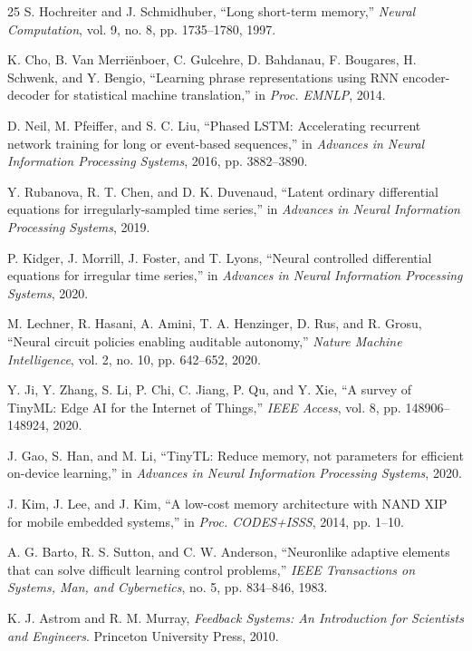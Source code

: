 \documentclass[conference]{IEEEtran}
\begin{document}
\begin{thebibliography}{25}
 S. Hochreiter and J. Schmidhuber, ``Long short-term memory,'' \textit{Neural Computation}, vol. 9, no. 8, pp. 1735--1780, 1997.

 K. Cho, B. Van Merri\"enboer, C. Gulcehre, D. Bahdanau, F. Bougares, H. Schwenk, and Y. Bengio, ``Learning phrase representations using RNN encoder-decoder for statistical machine translation,'' in \textit{Proc. EMNLP}, 2014.

 D. Neil, M. Pfeiffer, and S. C. Liu, ``Phased LSTM: Accelerating recurrent network training for long or event-based sequences,'' in \textit{Advances in Neural Information Processing Systems}, 2016, pp. 3882--3890.

 Y. Rubanova, R. T. Chen, and D. K. Duvenaud, ``Latent ordinary differential equations for irregularly-sampled time series,'' in \textit{Advances in Neural Information Processing Systems}, 2019.

 P. Kidger, J. Morrill, J. Foster, and T. Lyons, ``Neural controlled differential equations for irregular time series,'' in \textit{Advances in Neural Information Processing Systems}, 2020.

 M. Lechner, R. Hasani, A. Amini, T. A. Henzinger, D. Rus, and R. Grosu, ``Neural circuit policies enabling auditable autonomy,'' \textit{Nature Machine Intelligence}, vol. 2, no. 10, pp. 642--652, 2020.

 Y. Ji, Y. Zhang, S. Li, P. Chi, C. Jiang, P. Qu, and Y. Xie, ``A survey of TinyML: Edge AI for the Internet of Things,'' \textit{IEEE Access}, vol. 8, pp. 148906--148924, 2020.

 J. Gao, S. Han, and M. Li, ``TinyTL: Reduce memory, not parameters for efficient on-device learning,'' in \textit{Advances in Neural Information Processing Systems}, 2020.

 J. Kim, J. Lee, and J. Kim, ``A low-cost memory architecture with NAND XIP for mobile embedded systems,'' in \textit{Proc. CODES+ISSS}, 2014, pp. 1--10.

 A. G. Barto, R. S. Sutton, and C. W. Anderson, ``Neuronlike adaptive elements that can solve difficult learning control problems,'' \textit{IEEE Transactions on Systems, Man, and Cybernetics}, no. 5, pp. 834--846, 1983.

 K. J. Astrom and R. M. Murray, \textit{Feedback Systems: An Introduction for Scientists and Engineers}. Princeton University Press, 2010.


\end{thebibliography}
\end{document}
